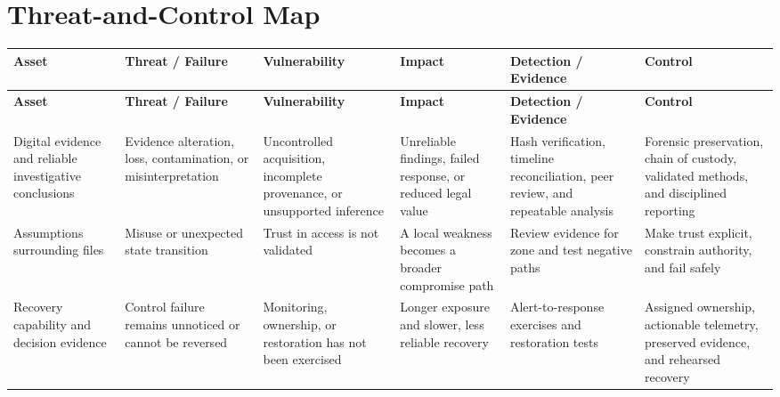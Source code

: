 \documentclass[11pt]{article}
\begin{document}
\section*{Threat-and-Control Map}
\begingroup\scriptsize\setlength{\tabcolsep}{2pt}
\begin{longtable}{>{\RaggedRight\arraybackslash}p{}>{\RaggedRight\arraybackslash}p{}>{\RaggedRight\arraybackslash}p{}>{\RaggedRight\arraybackslash}p{}>{\RaggedRight\arraybackslash}p{}>{\RaggedRight\arraybackslash}p{}}
\toprule\rowcolor{Navy}\color{white}\textbf{Asset} & \color{white}\textbf{Threat / Failure} & \color{white}\textbf{Vulnerability} & \color{white}\textbf{Impact} & \color{white}\textbf{Detection / Evidence} & \color{white}\textbf{Control}\\\midrule
\endfirsthead
\toprule\rowcolor{Navy}\color{white}\textbf{Asset} & \color{white}\textbf{Threat / Failure} & \color{white}\textbf{Vulnerability} & \color{white}\textbf{Impact} & \color{white}\textbf{Detection / Evidence} & \color{white}\textbf{Control}\\\midrule
\endhead
Digital evidence and reliable investigative conclusions & Evidence alteration, loss, contamination, or misinterpretation & Uncontrolled acquisition, incomplete provenance, or unsupported inference & Unreliable findings, failed response, or reduced legal value & Hash verification, timeline reconciliation, peer review, and repeatable analysis & Forensic preservation, chain of custody, validated methods, and disciplined reporting\\\midrule
Assumptions surrounding files & Misuse or unexpected state transition & Trust in access is not validated & A local weakness becomes a broader compromise path & Review evidence for zone and test negative paths & Make trust explicit, constrain authority, and fail safely\\\midrule
Recovery capability and decision evidence & Control failure remains unnoticed or cannot be reversed & Monitoring, ownership, or restoration has not been exercised & Longer exposure and slower, less reliable recovery & Alert-to-response exercises and restoration tests & Assigned ownership, actionable telemetry, preserved evidence, and rehearsed recovery\\\midrule
\bottomrule
\end{longtable}
\endgroup
\end{document}
